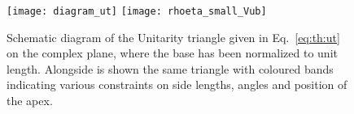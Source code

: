 \begin{figure}
  \begin{center}
      \texttt{[image: diagram\_ut]}
      \texttt{[image: rhoeta\_small\_Vub]}
  \end{center}
  \caption[Unitarity triangle]{\small
    Schematic diagram of the Unitarity triangle given in Eq.~\ref{eq:th:ut} on the complex plane,
    where the base has been normalized to unit length.
    Alongside is shown the same triangle with coloured bands indicating various constraints on
    side lengths, angles and position of the apex.
  }
  \label{fig:th:ut}
\end{figure}




